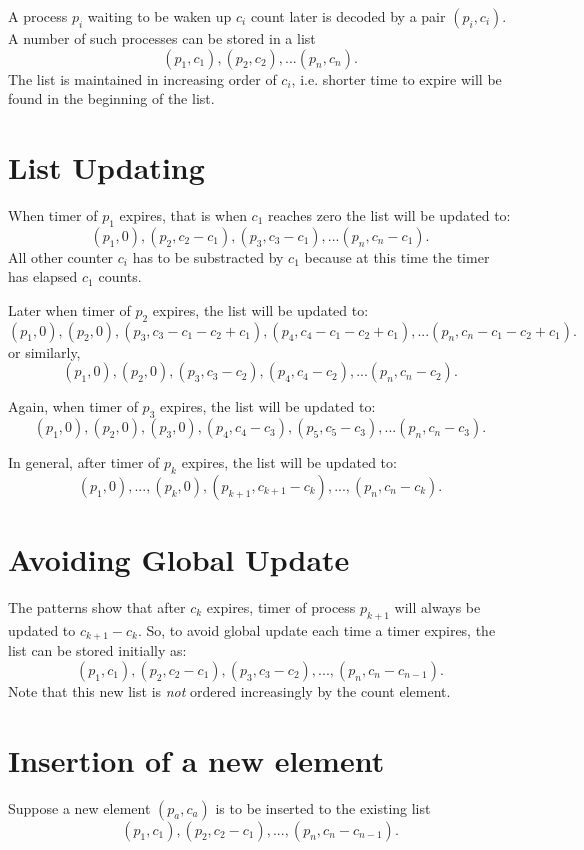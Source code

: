 \documentclass[12pt]{article}
\begin{document}
A process $p_i$ waiting to be waken up $c_i$ count later is decoded by a
pair $(p_i,c_i)$. A number of such processes can be stored in a list
$$
(p_1, c_1),
(p_2, c_2),
...
(p_n, c_n).$$
The list is maintained in increasing order of $c_i$, i.e. shorter time
to expire will be found in the beginning of the list.

\section*{List Updating}
When timer of $p_1$ expires, that is when $c_1$ reaches zero the list
will be updated to:
$$
(p_1, 0),
(p_2, c_2 - c_1),
(p_3, c_3 - c_1),
...
(p_n, c_n - c_1).
$$
All other counter $c_i$ has to be substracted by $c_1$ because at this
time the timer has elapsed $c_1$ counts.

Later when timer of $p_2$ expires, the list will be updated to:
$$
(p_1, 0),
(p_2, 0),
(p_3, c_3 - c_1 - c_2 + c_1),
(p_4, c_4 - c_1 - c_2 + c_1),
...
(p_n, c_n - c_1 - c_2 + c_1).
$$
or similarly,
$$
(p_1, 0),
(p_2, 0),
(p_3, c_3 - c_2),
(p_4, c_4 - c_2),
...
(p_n, c_n - c_2).
$$

Again, when timer of $p_3$ expires, the list will be updated to:
$$
(p_1, 0),
(p_2, 0),
(p_3, 0),
(p_4, c_4 - c_3),
(p_5, c_5 - c_3),
...
(p_n, c_n - c_3).
$$

In general, after timer of $p_k$ expires, the list will be updated to:
$$
(p_1, 0),..., (p_k,0),
(p_{k+1}, c_{k+1} - c_k),
...,
(p_n, c_n - c_k).
$$

\section*{Avoiding Global Update}
The patterns show that after $c_k$ expires, timer of process $p_{k+1}$
will always be updated to $c_{k+1} - c_k$. So, to avoid global update
each time a timer expires, the list can be stored initially as:
$$
(p_1, c_1),
(p_2, c_2 - c_1),
(p_3, c_3 - c_2),
...,
(p_n, c_n - c_{n-1}).
$$
Note that this new list is \textit{not} ordered increasingly by the
count element.

\section*{Insertion of a new element}
Suppose a new element $(p_a, c_a)$ is to be inserted to the existing
list
$$
(p_1, c_1),
(p_2, c_2 - c_1),
...,
(p_n, c_n - c_{n-1}).
$$
\end{document}
